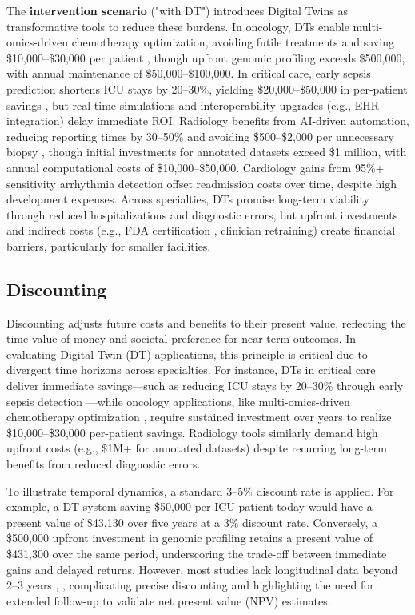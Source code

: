 \documentclass[10pt,a4paper]{article}
\begin{document}
The \textbf{intervention scenario} ("with DT") introduces Digital Twins as transformative tools to reduce these burdens. In oncology, DTs enable multi-omics-driven chemotherapy optimization, avoiding futile treatments and saving \$10,000–\$30,000 per patient \cite{Wang2025}, though upfront genomic profiling exceeds \$500,000, with annual maintenance of \$50,000–\$100,000. In critical care, early sepsis prediction shortens ICU stays by 20–30\%, yielding \$20,000–\$50,000 in per-patient savings \cite{Mascret2024}, but real-time simulations and interoperability upgrades (e.g., EHR integration) delay immediate ROI. Radiology benefits from AI-driven automation, reducing reporting times by 30–50\% and avoiding \$500–\$2,000 per unnecessary biopsy \cite{Bocean2025}, though initial investments for annotated datasets exceed \$1 million, with annual computational costs of \$10,000–\$50,000. Cardiology gains from 95\%+ sensitivity arrhythmia detection offset readmission costs over time, despite high development expenses. Across specialties, DTs promise long-term viability through reduced hospitalizations and diagnostic errors, but upfront investments and indirect costs (e.g., FDA certification \cite{Wang2025}, clinician retraining) create financial barriers, particularly for smaller facilities.

\subsection*{Discounting}

Discounting adjusts future costs and benefits to their present value, reflecting the time value of money and societal preference for near-term outcomes. In evaluating Digital Twin (DT) applications, this principle is critical due to divergent time horizons across specialties. For instance, DTs in critical care deliver immediate savings—such as reducing ICU stays by 20–30\% through early sepsis detection \cite{Mascret2024}—while oncology applications, like multi-omics-driven chemotherapy optimization \cite{Wang2025}, require sustained investment over years to realize \$10,000–\$30,000 per-patient savings. Radiology tools \cite{Bocean2025} similarly demand high upfront costs (e.g., \$1M+ for annotated datasets) despite recurring long-term benefits from reduced diagnostic errors.

To illustrate temporal dynamics, a standard 3–5\% discount rate is applied. For example, a DT system saving \$50,000 per ICU patient today would have a present value of \$43,130 over five years at a 3\% discount rate. Conversely, a \$500,000 upfront investment in genomic profiling retains a present value of \$431,300 over the same period, underscoring the trade-off between immediate gains and delayed returns. However, most studies lack longitudinal data beyond 2–3 years \cite{Mascret2024}, \cite{Wang2025}, complicating precise discounting and highlighting the need for extended follow-up to validate net present value (NPV) estimates.
\end{document}
